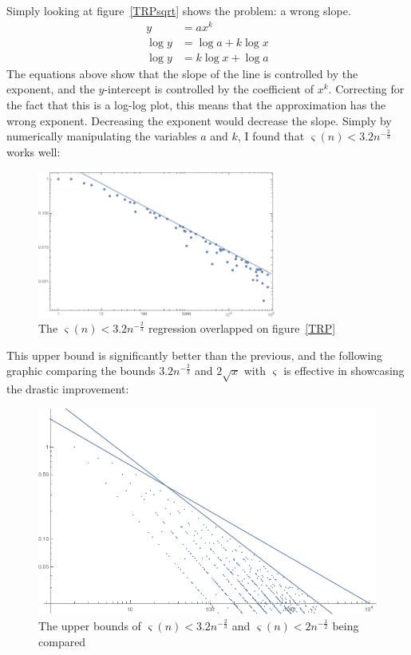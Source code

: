 \documentclass[12pt]{article}
\begin{document}
			Simply looking at figure~\ref{TRPsqrt} shows the problem: a wrong slope. 
			\begin{align*}
				y&=ax^k\\
				\log y&=\log a+k\log x\\
				\log y&=k\log x+\log a
			\end{align*}
			The equations above show that the slope of the line is controlled by the exponent, and the $y$-intercept is controlled by the coefficient of $x^k$. Correcting for the fact that this is a log-log plot, this means that the approximation has the wrong exponent. Decreasing the exponent would decrease the slope. 
			Simply by numerically manipulating the variables $a$ and $k$, I found that $\varsigma(n)< 3.2n^{-\frac{2}{3}}$ works well:
			\begin{figure}[H]
				\includegraphics[width=0.7\textwidth]{../Images/GoodReg.png}
				\caption{The $\varsigma(n)< 3.2n^{-\frac{2}{3}}$ regression overlapped on figure~\ref{TRP}\label{TRPgood}}
			\end{figure}
			This upper bound is significantly better than the previous, and the following graphic comparing the bounds $3.2n^{-\frac{2}{3}}$ and $2\sqrt{x}$ with $\varsigma$ is effective in showcasing the drastic improvement:
			\begin{figure}[H]
				\includegraphics[width=1.0\textwidth]{../Images/RegComp.png}
				\caption{The upper bounds of $\varsigma(n)< 3.2n^{-\frac{2}{3}}$ and $\varsigma(n)< 2n^{-\frac{1}{2}}$ being compared\label{TRPcomp}}
			\end{figure}
\end{document}
